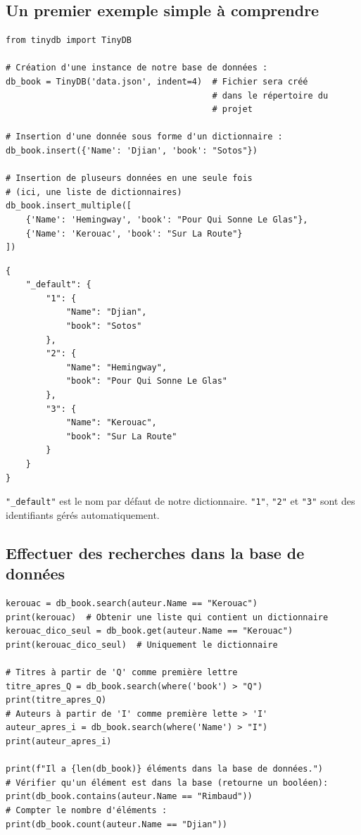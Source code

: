 \documentclass[a4paper,12pt]{book}
\begin{document}
\subsection*{Un premier exemple simple à comprendre}
\begin{lstlisting}[caption=Le fichier \texttt{Python}]
from tinydb import TinyDB

# Création d'une instance de notre base de données :
db_book = TinyDB('data.json', indent=4)  # Fichier sera créé 
                                         # dans le répertoire du 
                                         # projet

# Insertion d'une donnée sous forme d'un dictionnaire :
db_book.insert({'Name': 'Djian', 'book': "Sotos"})

# Insertion de pluseurs données en une seule fois
# (ici, une liste de dictionnaires)
db_book.insert_multiple([
    {'Name': 'Hemingway', 'book': "Pour Qui Sonne Le Glas"},
    {'Name': 'Kerouac', 'book': "Sur La Route"}
])
\end{lstlisting}
\medskip

\begin{lstlisting}[caption=Le fichier \texttt{.json} généré]
{
    "_default": {
        "1": {
            "Name": "Djian",
            "book": "Sotos"
        },
        "2": {
            "Name": "Hemingway",
            "book": "Pour Qui Sonne Le Glas"
        },
        "3": {
            "Name": "Kerouac",
            "book": "Sur La Route"
        }
    }
}
\end{lstlisting}
\medskip

\texttt{"\_default"} est le nom par défaut de notre dictionnaire. \texttt{"1"}, \texttt{"2"} et \texttt{"3"} sont des identifiants gérés automatiquement.
\medskip

\subsection*{Effectuer des recherches dans la base de données}
\begin{lstlisting}[caption=Quelques recherches dans la base de données]
kerouac = db_book.search(auteur.Name == "Kerouac")
print(kerouac)  # Obtenir une liste qui contient un dictionnaire
kerouac_dico_seul = db_book.get(auteur.Name == "Kerouac")
print(kerouac_dico_seul)  # Uniquement le dictionnaire

# Titres à partir de 'Q' comme première lettre
titre_apres_Q = db_book.search(where('book') > "Q")
print(titre_apres_Q)  
# Auteurs à partir de 'I' comme première lette > 'I'
auteur_apres_i = db_book.search(where('Name') > "I")
print(auteur_apres_i)  

print(f"Il a {len(db_book)} éléments dans la base de données.")
# Vérifier qu'un élément est dans la base (retourne un booléen):
print(db_book.contains(auteur.Name == "Rimbaud"))
# Compter le nombre d'éléments :
print(db_book.count(auteur.Name == "Djian"))
\end{lstlisting}
\medskip
\end{document}
